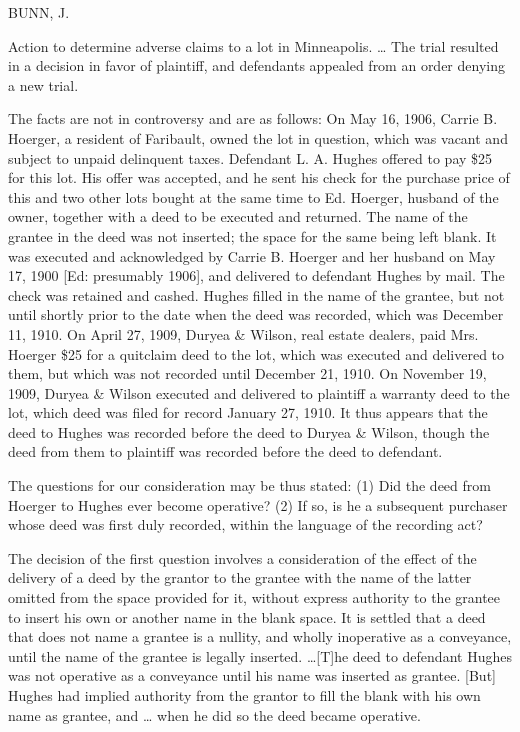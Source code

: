 
\textsc{BUNN}, J.

Action to determine adverse claims to a lot in Minneapolis. \dots{} The trial
resulted in a decision in favor of plaintiff, and defendants appealed from an
order denying a new trial.

The facts are not in controversy and are as follows: On May 16, 1906, Carrie B.
Hoerger, a resident of Faribault, owned the lot in question, which was vacant
and subject to unpaid delinquent taxes. Defendant L. A. Hughes offered to pay
\$25 for this lot. His offer was accepted, and he sent his check for the
purchase price of this and two other lots bought at the same time to Ed.
Hoerger, husband of the owner, together with a deed to be executed and
returned. The name of the grantee in the deed was not inserted; the space for
the same being left blank. It was executed and acknowledged by Carrie B.
Hoerger and her husband on May 17, 1900 [Ed: presumably 1906], and delivered to
defendant Hughes by mail. The check was retained and cashed. Hughes filled in
the name of the grantee, but not until shortly prior to the date when the deed
was recorded, which was December 11, 1910. On April 27, 1909, Duryea \& Wilson,
real estate dealers, paid Mrs. Hoerger \$25 for a quitclaim deed to the lot,
which was executed and delivered to them, but which was not recorded until
December 21, 1910. On November 19, 1909, Duryea \& Wilson executed and
delivered to plaintiff a warranty deed to the lot, which deed was filed for
record January 27, 1910. It thus appears that the deed to Hughes was recorded
before the deed to Duryea \& Wilson, though the deed from them to plaintiff was
recorded before the deed to defendant.

The questions for our consideration may be thus stated: (1) Did the deed from
Hoerger to Hughes ever become operative? (2) If so, is he a subsequent
purchaser whose deed was first duly recorded, within the language of the
recording act?

The decision of the first question involves a consideration of the effect of the
delivery of a deed by the grantor to the grantee with the name of the latter
omitted from the space provided for it, without express authority to the
grantee to insert his own or another name in the blank space. It is settled
that a deed that does not name a grantee is a nullity, and wholly inoperative
as a conveyance, until the name of the grantee is legally inserted.
\dots{}[T]he deed to defendant Hughes was not operative as a conveyance until
his name was inserted as grantee. [But] Hughes had implied authority from the
grantor to fill the blank with his own name as grantee, and \dots{} when he did
so the deed became operative.

